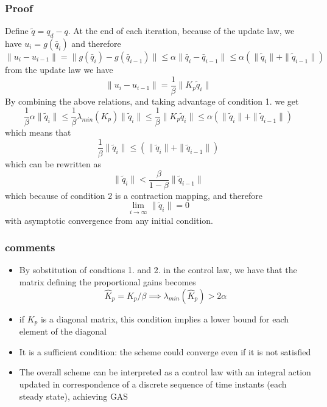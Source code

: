 \documentclass{book}
\begin{document}
\subsubsection{Proof}
Define $\tilde{q}=q_d-q$. At the end of each iteration, because of the update law, we have $u_i=g(\bar{q}_i)$ and therefore 
\[
    \|u_i-u_{i-1}\| = \| g(\bar{q}_i)-g(\bar{q}_{i-1}) \| \leq \alpha\|\bar{q}_i-\bar{q}_{i-1}\| \leq \alpha(\|\tilde{q}_i\| + \|\tilde{q}_{i-1}\|)
\]
from the update law we have 
\[
    \|u_i-u_{i-1}\| = \displaystyle\frac{1}{\beta}\|K_p\tilde{q}_i\|
\]
By combining the above relations, and taking advantage of condition 1. we get 
\[
    \displaystyle\frac{1}{\beta}\alpha \|\tilde{q}_i\| \leq \displaystyle\frac{1}{\beta}\lambda_{min}(K_p)\|\tilde{q}_i\| \leq \displaystyle\frac{1}{\beta}\|K_p\tilde{q}_i\| \leq \alpha(\|\tilde{q}_i\|+\|\tilde{q}_{i-1}\|)
\]
which means that 
\[
    \displaystyle\frac{1}{\beta} \|\tilde{q}_i\| \leq (\|\tilde{q}_i\|+\|\tilde{q}_{i-1}\|)
\]
which can be rewritten as 
\[
    \|\tilde{q}_i\| < \displaystyle\frac{\beta}{1-\beta}\|\tilde{q}_{i-1}\|
\]
which because of condition 2 is a contraction mapping, and therefore 
\[
    \lim_{i\to\infty} \|\tilde{q}_i\|=0
\]
with asymptotic convergence from any initial condition. 
\subsubsection{comments}
\begin{itemize}
    \item By sobstitution of condtions 1. and 2. in the control law, we have that the matrix defining the proportional gains becomes 
        \[
            \hat{K}_p=K_p/\beta \implies \lambda_{min}(\hat{K}_p)>2\alpha
        \]
    \item if $K_p$ is a diagonal matrix, this condition implies a lower bound for each element of the diagonal 
    \item It is a sufficient condition: the scheme could converge even if it is not satisfied 
    \item The overall scheme can be interpreted as a control law with an integral action updated in correspondence of a discrete sequence of time instants (each steady state), achieving GAS
\end{itemize}
\end{document}
